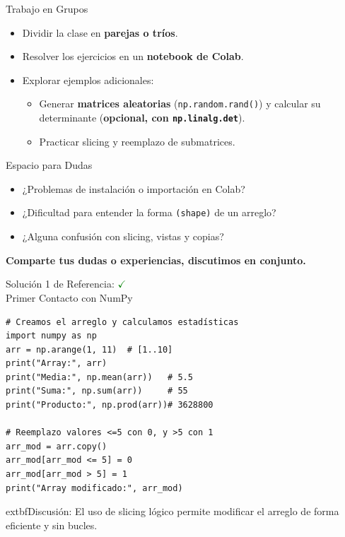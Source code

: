 \documentclass[10pt]{beamer}
\begin{document}
\begin{frame}{Trabajo en Grupos}
  \begin{itemize}
    \item Dividir la clase en \textbf{parejas o tríos}.
    \item Resolver los ejercicios en un \textbf{notebook de Colab}.
    \item Explorar ejemplos adicionales: 
      \begin{itemize}
        \item Generar \textbf{matrices aleatorias} (\texttt{np.random.rand()}) y calcular su determinante (\textbf{opcional, con \texttt{np.linalg.det}}).
        \item Practicar slicing y reemplazo de submatrices.
      \end{itemize}
  \end{itemize}
\end{frame}

\begin{frame}{Espacio para Dudas}
  \begin{itemize}
    \item ¿Problemas de instalación o importación en Colab?
    \item ¿Dificultad para entender la forma \texttt{(shape)} de un arreglo?
    \item ¿Alguna confusión con slicing, vistas y copias?
  \end{itemize}
  \vspace{0.3cm}
  \textbf{Comparte tus dudas o experiencias, discutimos en conjunto.}
\end{frame}

\begin{frame}[fragile]{Solución 1 de Referencia: \hfill \textcolor{green}{$\checkmark$} \\ Primer Contacto con NumPy}
\begin{verbatim}
# Creamos el arreglo y calculamos estadísticas
import numpy as np
arr = np.arange(1, 11)  # [1..10]
print("Array:", arr)
print("Media:", np.mean(arr))   # 5.5
print("Suma:", np.sum(arr))     # 55
print("Producto:", np.prod(arr))# 3628800

# Reemplazo valores <=5 con 0, y >5 con 1
arr_mod = arr.copy()
arr_mod[arr_mod <= 5] = 0
arr_mod[arr_mod > 5] = 1
print("Array modificado:", arr_mod)
\end{verbatim}
	extbf{Discusión:} El uso de slicing lógico permite modificar el arreglo de forma eficiente y sin bucles.
\end{frame}
\end{document}
